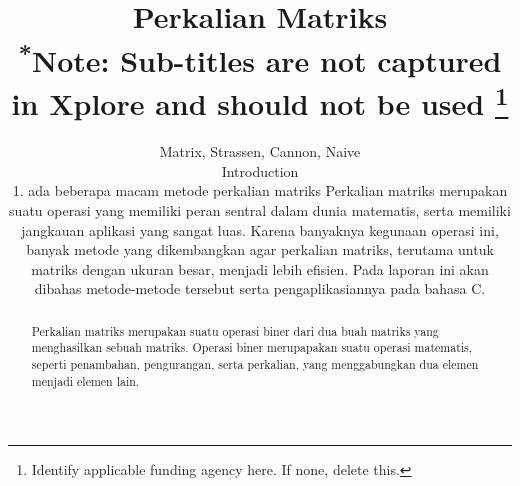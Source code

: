 \documentclass[conference]{IEEEtran}
\begin{document}
\title{Perkalian Matriks\\
{\footnotesize \textsuperscript{*}Note: Sub-titles are not captured in Xplore and
should not be used}
\thanks{Identify applicable funding agency here. If none, delete this.}
}

\author{

\and
\author{

\and
\author{
}

\maketitle

\begin{abstract}
Perkalian matriks merupakan suatu operasi biner dari dua buah matriks yang menghasilkan sebuah matriks. Operasi biner merupapakan suatu operasi matematis, seperti penambahan, pengurangan, serta perkalian, yang menggabungkan dua elemen menjadi elemen lain.
\end{abstract}

\begin{IEEEkeywords}
Matrix, Strassen, Cannon, Naive
\end{IEEEkeywords}

\section{Introduction}
1. ada beberapa macam metode perkalian matriks
Perkalian matriks merupakan suatu operasi yang memiliki peran sentral dalam dunia matematis, serta memiliki jangkauan aplikasi yang sangat luas.  Karena banyaknya kegunaan operasi ini, banyak metode yang dikembangkan agar perkalian matriks, terutama untuk matriks dengan ukuran besar, menjadi lebih efisien. Pada laporan ini akan dibahas metode-metode tersebut serta pengaplikasiannya pada bahasa C.

}}
\end{document}
